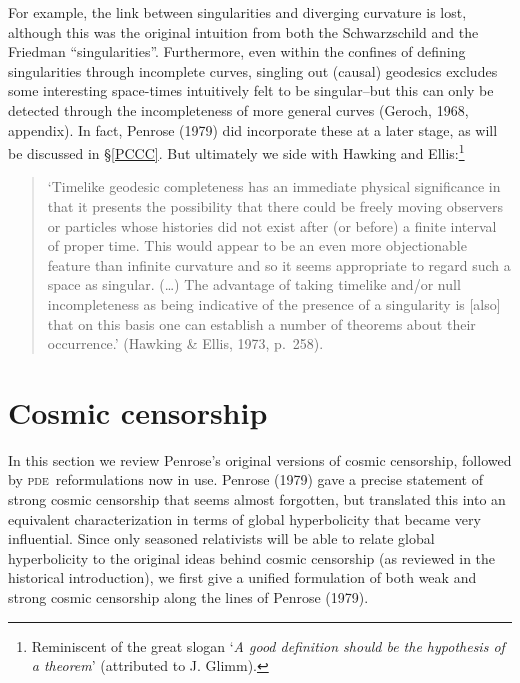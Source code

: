 \documentclass[11pt,a4paper]{article}
\newcommand{\pde}{\textsc{pde}}
\begin{document}
For example, the link between singularities and diverging curvature is lost, although this was the original intuition  from both the Schwarzschild and the Friedman ``singularities''. Furthermore, even within the confines of defining singularities through incomplete curves, singling out (causal) geodesics excludes some interesting space-times intuitively felt to be singular--but this can only be detected through the incompleteness of more general curves (Geroch, 1968, appendix). In fact, Penrose (1979)  did incorporate these at a later stage, as will be discussed in \S\ref{PCCC}. 
But ultimately we side with 
  Hawking and Ellis:\footnote{Reminiscent of the great slogan `\emph{A good definition should be the hypothesis of a theorem}' (attributed to J. Glimm).}
 \begin{quote}\begin{small}
`Timelike geodesic completeness has an immediate physical significance in that it presents the possibility that there could be freely moving observers or particles whose histories did not exist after (or before) a finite interval of proper time. This would appear to be an even more objectionable feature than infinite curvature and so it seems appropriate to regard such a space as singular. (\ldots)  The advantage of taking timelike and/or null incompleteness as being indicative of the presence of a singularity is [also] that on this basis one can establish a number of theorems about their occurrence.' (Hawking \& Ellis, 1973, p.\ 258).
 \end{small}
\end{quote}
\section{Cosmic censorship}\label{CCC}
In this section we review Penrose's original versions of cosmic censorship, followed by \pde\ reformulations now in  use.
Penrose (1979) gave a precise statement of strong cosmic censorship that seems almost forgotten, but  translated this into an equivalent characterization in terms of global hyperbolicity that became very influential. 
Since only seasoned relativists will be able to relate global hyperbolicity to the original ideas behind cosmic censorship  (as reviewed in the historical introduction), we first 
 give a unified formulation of both weak and strong cosmic censorship along the lines of Penrose (1979). 
\end{document}
